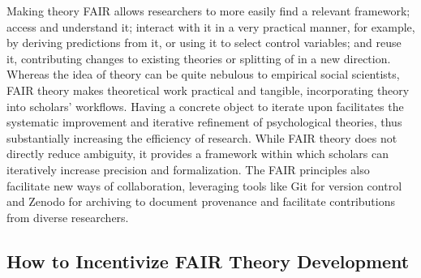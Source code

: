\documentclass[
  man,floatsintext]{apa6}
\begin{document}
Making theory FAIR allows researchers to more easily find a relevant framework;
access and understand it; interact with it in a very practical manner, for example, by deriving predictions from it, or using it to select control variables; and reuse it, contributing changes to existing theories or splitting of in a new direction.
Whereas the idea of theory can be quite nebulous to empirical social scientists,
FAIR theory makes theoretical work practical and tangible, incorporating theory into scholars' workflows.
Having a concrete object to iterate upon facilitates the systematic improvement and iterative refinement of psychological theories, thus substantially increasing the efficiency of research.
While FAIR theory does not directly reduce ambiguity,
it provides a framework within which scholars can iteratively increase precision and formalization.
The FAIR principles also facilitate new ways of collaboration,
leveraging tools like Git for version control and Zenodo for archiving to document provenance and facilitate contributions from diverse researchers.

\subsection{How to Incentivize FAIR Theory Development}\label{how-to-incentivize-fair-theory-development}
\end{document}
